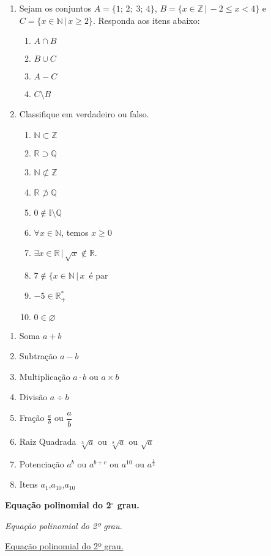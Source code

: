 \documentclass[a4paper,12pt]{article}
\begin{document}
\begin{enumerate}
\item Sejam os conjuntos $A =\{1;\, 2;\; 3;\ 4\}$,
$B = \{x \in \mathbb{Z}\,|\,-2 \leq x < 4\}$ e $C = \{x \in \mathbb{N}\,|\,x \geq 2\}$.
Responda aos itens abaixo:


\begin{enumerate}
\item $A \cap B$
\item $B \cup C$
\item $A - C$
\item $C \setminus B$
\end{enumerate}
\item Classifique em verdadeiro ou falso.
\begin{enumerate}
\item $\mathbb{N} \subset \mathbb{Z}$
\item $\mathbb{R} \supset \mathbb{Q}$
\item $\mathbb{N} \not\subset \mathbb{Z}$
\item $\mathbb{R} \not\supset \mathbb{Q}$
\item $0 \not\in \mathbb{I} \setminus \mathbb{Q}$
\item $\forall x \in \mathbb{N}$, temos $x \geq 0$
\item $\exists x \in \mathbb{R} \,|\, \sqrt{x} \not\in \mathbb{R}$.
\item $7 \not\in \{x\in \mathbb{N} \,|\, x\, \textrm{ é par}$
\item $-5 \in \mathbb{R}^*_+$
\item $0 \in \varnothing$
\end{enumerate}
\end{enumerate}

\begin{enumerate}
\item Soma
$a + b$
\item Subtração
$a - b$
\item Multiplicação
$a \cdot b$ ou $a \times b$
\item Divisão
$a \div b$
\item Fração
$\frac{a}{b}$ ou $\dfrac{a}{b}$
\item Raiz Quadrada
$\sqrt[3]{a}$ ou $\sqrt[8]{a}$ ou $\sqrt{a}$
\item Potenciação
$a^b$ ou $a^{b+c}$ ou $a^{10}$ ou $a^\frac{1}{2}$
\item Itens
$a_1$,$a_10$,$a_{10}$
\end{enumerate}

\begin{center}
\textbf{Equa\c c\~ao polinomial do 2$^\circ$ grau.}
\end{center}
\begin{flushleft}
\textit{Equação polinomial do 2º grau.}
\end{flushleft}
\begin{flushright}
\underline{Equação polinomial do 2º grau.}
\end{flushright}
\end{document}
